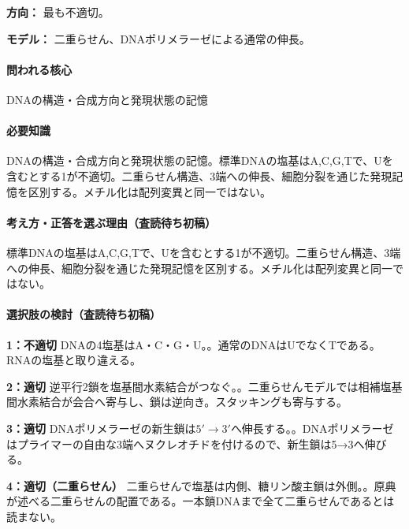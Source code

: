 \noindent\textbf{方向：} 最も不適切。\par

\noindent\textbf{モデル：} 二重らせん、DNAポリメラーゼによる通常の伸長。\par

\paragraph{問われる核心} DNAの構造・合成方向と発現状態の記憶

\paragraph{必要知識} DNAの構造・合成方向と発現状態の記憶。標準DNAの塩基はA,C,G,Tで、Uを含むとする1が不適切。二重らせん構造、3端への伸長、細胞分裂を通じた発現記憶を区別する。メチル化は配列変異と同一ではない。

\paragraph{考え方・正答を選ぶ理由（査読待ち初稿）} 標準DNAの塩基はA,C,G,Tで、Uを含むとする1が不適切。二重らせん構造、3端への伸長、細胞分裂を通じた発現記憶を区別する。メチル化は配列変異と同一ではない。

\paragraph{選択肢の検討（査読待ち初稿）}\mbox{}\par

\noindent\textbf{1：不適切} DNAの4塩基はA・C・G・U。。通常のDNAはUでなくTである。RNAの塩基と取り違える。\par

\noindent\textbf{2：適切} 逆平行2鎖を塩基間水素結合がつなぐ。。二重らせんモデルでは相補塩基間水素結合が会合へ寄与し、鎖は逆向き。スタッキングも寄与する。\par

\noindent\textbf{3：適切} DNAポリメラーゼの新生鎖は\(5'\to3'\)へ伸長する。。DNAポリメラーゼはプライマーの自由な3端へヌクレオチドを付けるので、新生鎖は5→3へ伸びる。\par

\noindent\textbf{4：適切（二重らせん）} 二重らせんで塩基は内側、糖リン酸主鎖は外側。。原典が述べる二重らせんの配置である。一本鎖DNAまで全て二重らせんであるとは読まない。\par

